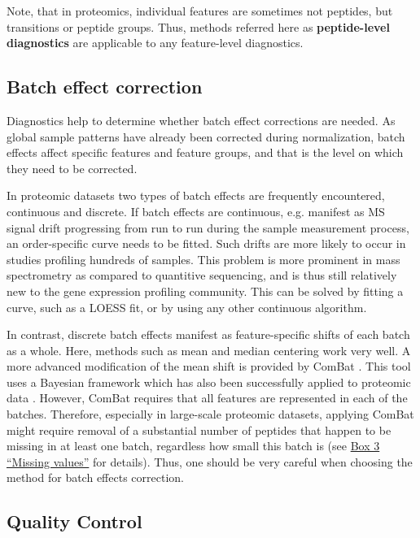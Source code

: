 \documentclass[num-refs]{wiley-article}
\begin{document}
Note, that in proteomics, individual features are sometimes not peptides, but transitions or peptide groups. Thus, methods referred here as \textbf{peptide-level diagnostics} are applicable to any feature-level diagnostics.

\subsection{Batch effect correction}

Diagnostics help to determine whether batch effect corrections are needed. As global sample patterns have already been corrected during normalization, batch effects affect specific features and feature groups, and that is the level on which they need to be corrected.

In proteomic datasets two types of batch effects are frequently encountered, continuous and discrete. If batch effects are continuous, e.g.  manifest as MS signal drift progressing from run to run during the sample measurement process, an order-specific curve needs to be fitted. Such drifts are more likely to occur in studies profiling hundreds of samples. This problem is more prominent in mass spectrometry as compared to quantitive sequencing, and is thus still relatively new to the gene expression profiling community. This can be solved by fitting a curve, such as a LOESS fit, or by using any other continuous algorithm.

In contrast, discrete batch effects manifest as feature-specific shifts of each batch as a whole. Here, methods such as mean and median centering work very well. A more advanced modification of the mean shift is provided by ComBat \cite{Johnson:2007aa}. This tool uses a Bayesian framework which has also been successfully applied to proteomic data \cite{Lee:2019aa}. However, ComBat requires that all features are represented in each of the batches. Therefore, especially in large-scale proteomic datasets, applying ComBat might require removal of  a substantial number of peptides that happen to be missing in at least one batch, regardless how small this batch is (see \hyperref[box:Box3_missingness]{Box 3 “Missing values”} for details). Thus, one should be very careful when choosing the method for batch effects correction.

\subsection{Quality Control}\label{subsec:qc}
\end{document}
